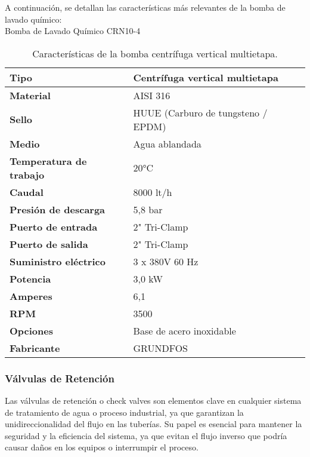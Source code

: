 A continuación, se detallan las características más relevantes de la bomba de lavado químico:\\

Bomba de Lavado Químico CRN10-4\\

\begin{table}[H]
    \centering
    \caption{Características de la bomba centrífuga vertical multietapa.}
    \label{table:bomba_lavado_quimico}
    \begin{tabular}{| L{5cm} | L{5cm} |}
        \hline
        \textbf{Tipo} & Centrífuga vertical multietapa \\
        \hline
        \textbf{Material} & AISI 316 \\
        \hline
        \textbf{Sello} & HUUE (Carburo de tungsteno / EPDM) \\
        \hline
        \textbf{Medio} & Agua ablandada \\
        \hline
        \textbf{Temperatura de trabajo} & 20°C \\
        \hline
        \textbf{Caudal} & 8000 lt/h \\
        \hline
        \textbf{Presión de descarga} & 5,8 bar \\
        \hline
        \textbf{Puerto de entrada} & 2" Tri-Clamp \\
        \hline
        \textbf{Puerto de salida} & 2" Tri-Clamp \\
        \hline
        \textbf{Suministro eléctrico} & 3 x 380V 60 Hz \\
        \hline
        \textbf{Potencia} & 3,0 kW \\
        \hline
        \textbf{Amperes} & 6,1 \\
        \hline
        \textbf{RPM} & 3500 \\
        \hline
        \textbf{Opciones} & Base de acero inoxidable \\
        \hline
        \textbf{Fabricante} & GRUNDFOS \\
        \hline
    \end{tabular}
\end{table}

\subsubsection{Válvulas de Retención}

Las válvulas de retención o check valves son elementos clave en cualquier sistema de tratamiento de agua o proceso industrial, ya que garantizan la unidireccionalidad del flujo en las tuberías. Su papel es esencial para mantener la seguridad y la eficiencia del sistema, ya que evitan el flujo inverso que podría causar daños en los equipos o interrumpir el proceso.\\

